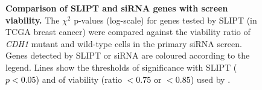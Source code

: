\begin{figure}[!htbp]
\begin{center}
   \end{center}
   \caption[Comparison of SLIPT and siRNA genes with screen viability]{\small \textbf{Comparison of \gls{SLIPT} and \gls{siRNA} genes with screen viability.} The $\chi^2$ p-values (log-scale) for genes tested by \gls{SLIPT} (in \gls{TCGA} breast cancer) were compared against the viability ratio of \textit{CDH1} \gls{mutant} and \gls{wild-type} cells in the primary \gls{siRNA} screen. Genes detected by \gls{SLIPT} or \gls{siRNA} are coloured according to the legend. Lines show the thresholds of significance with \gls{SLIPT} \textcolor{black}{($p<0.05$)} and of viability \textcolor{black}{(ratio $<0.75$ or $<0.85$)} used by \citet{Telford2015}. %
}
\label{fig:compare_points_viability_SL}


\end{figure}
